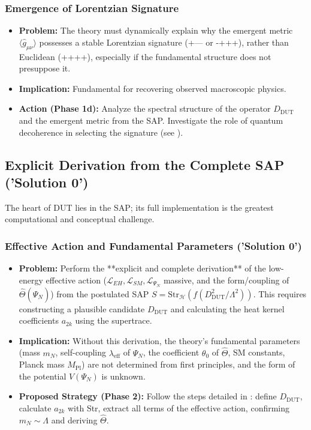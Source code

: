 \documentclass[11pt, a4paper]{article}
\theoremstyle{remark}
\newcommand{\Op}[1]{\hat{#1}}
\newcommand{\Str}{\mathrm{Str}}
\begin{document}
\subsubsection{Emergence of Lorentzian Signature}
\label{ssubsec:lorentz_sig_challenge_detailed}
\begin{itemize}
    \item \textbf{Problem:} The theory must dynamically explain why the emergent metric \( \langle \Op{g}_{\mu\nu} \rangle \) possesses a stable Lorentzian signature (+--- or -+++), rather than Euclidean (++++), especially if the fundamental structure does not presuppose it.
    \item \textbf{Implication:} Fundamental for recovering observed macroscopic physics.
    \item \textbf{Action (Phase 1d):} Analyze the spectral structure of the operator \( D_{\text{DUT}} \) and the emergent metric from the SAP. Investigate the role of quantum decoherence in selecting the signature (see ).
\end{itemize}

\subsection{Explicit Derivation from the Complete SAP ('Solution 0')}
\label{subsec:pae_derivation_detailed}

The heart of DUT lies in the SAP; its full implementation is the greatest computational and conceptual challenge.

\subsubsection{Effective Action and Fundamental Parameters ('Solution 0')}
\label{ssubsec:pae_derivation_challenge_detailed}
\begin{itemize}
    \item \textbf{Problem:} Perform the **explicit and complete derivation** of the low-energy effective action (\(\mathcal{L}_{EH}, \mathcal{L}_{SM}, \mathcal{L}_{\Psi_N}\) massive, and the form/coupling of \( \Op{\Theta}(\Op{\Psi}_N) \)) from the postulated SAP \( S = \Str_{\mathcal{H}}(f(D_{\text{DUT}}^2/\Lambda^2)) \). This requires constructing a plausible candidate \( D_{\text{DUT}} \) and calculating the heat kernel coefficients \( a_{2k} \) using the supertrace.
    \item \textbf{Implication:} Without this derivation, the theory's fundamental parameters (mass \( m_N \), self-coupling \( \lambda_{\text{eff}} \) of \( \Psi_N \), the coefficient \( \theta_0 \) of \( \Op{\Theta} \), SM constants, Planck mass \( M_{\text{Pl}} \)) are not determined from first principles, and the form of the potential \(V(\Psi_N)\) is unknown.
    \item \textbf{Proposed Strategy (Phase 2):} Follow the steps detailed in : define \( D_{\text{DUT}} \), calculate \(a_{2k}\) with Str, extract all terms of the effective action, confirming \( m_N \sim \Lambda \) and deriving \( \Op{\Theta} \).
\end{itemize}
\end{document}
